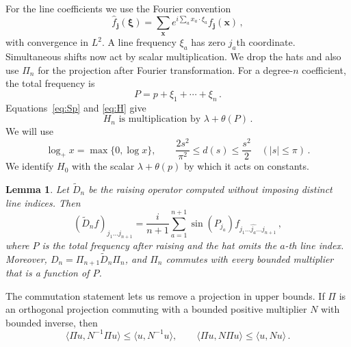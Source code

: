 \documentclass[11pt]{amsart}
\theoremstyle{plain}
\newtheorem{lemma}[theorem]{Lemma}
\theoremstyle{definition}
\newcommand{\1}{\mathbf 1}
\newcommand{\ip}[2]{\langle #1,#2\rangle}
\newcommand{\abs}[1]{\lvert #1\rvert}
\begin{document}
For the line coefficients we use the Fourier convention
\begin{equation}\label{eq:line-fourier}
  \widehat f_{\mathbf j}(\boldsymbol\xi)
  =\sum_{\mathbf x}e^{i\sum_a x_a\cdot\xi_a}f_{\mathbf j}(\mathbf x)\, ,
\end{equation}
with convergence in $L^2$.  A line frequency $\xi_a$ has zero $j_a$th
coordinate.  Simultaneous shifts now act by scalar multiplication.
We drop the hats and also use $\Pi_n$ for the projection after Fourier
transformation.
For a degree-$n$ coefficient, the total frequency is
\begin{equation}\label{eq:P}
  P=p+\xi_1+\cdots+\xi_n\, .
\end{equation}
Equations~\eqref{eq:Sp} and \eqref{eq:H} give
\begin{equation}\label{eq:Hsym}
  \text{$H_n$ is multiplication by }\lambda+\theta(P)\, .
\end{equation}
We will use
\begin{equation}\label{eq:sine}
  \log_+x=\max\{0,\log x\},
  \qquad \frac{2s^2}{\pi^2}\leq d(s)\leq\frac{s^2}{2}
  \quad (\abs s\leq\pi)\, .
\end{equation}
We identify $H_0$ with the scalar $\lambda+\theta(p)$ by which it acts
on constants.

\begin{lemma}\label{lem:raise}
Let $\widetilde D_n$ be the raising operator computed without imposing
distinct line indices.  Then
\begin{equation}\label{eq:raise}
  (\widetilde D_nf)_{j_1\dots j_{n+1}}
  =\frac i{n+1}\sum_{a=1}^{n+1}\sin(P_{j_a})
  f_{j_1\dots\widehat{j_a}\dots j_{n+1}}\, ,
\end{equation}
where $P$ is the total frequency after raising and the hat omits the
$a$-th line index.  Moreover,
$D_n=\Pi_{n+1}\widetilde D_n\Pi_n$, and $\Pi_n$ commutes with every bounded
multiplier that is a function of $P$.
\end{lemma}

The commutation statement lets us remove a projection in upper bounds.
If $\Pi$ is an orthogonal projection commuting with a bounded positive
multiplier $N$ with bounded inverse, then
\begin{equation}\label{eq:contract}
  \ip{\Pi u}{N^{-1}\Pi u}\leq\ip u{N^{-1}u},\qquad
  \ip{\Pi u}{N\Pi u}\leq\ip u{Nu}\, .
\end{equation}
\end{document}
